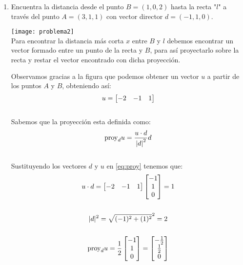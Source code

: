 \documentclass[12pt,titlepage]{article}
\begin{document}
\begin{enumerate}
\clearpage
 \item Encuentra la distancia desde el punto $B= (1, 0, 2)$ hasta la recta  "$l$" a través del punto $A=(3, 1, 1)$ con vector director $d=(-1, 1, 0)$.
 \par \parskip 8mm
 \texttt{[image: problema2]}\\
 Para encontrar la distancia más corta $x$ entre $B$ y $l$ debemos encontrar un vector formado entre un punto de la recta y $B$, para así proyectarlo sobre la recta y restar el vector encontrado con dicha proyección.
 \par \parskip 8mm
 Observamos gracias a la figura que podemos obtener un vector $u$ a partir de los puntos $A$ y $B$, obteniendo así:
 \begin{equation} \setcounter{equation}{1}
    u=\begin{bmatrix}-2&-1&1\\\end{bmatrix} \nonumber
 \end{equation}\\
 Sabemos que la proyección esta definida como:
 \begin{equation}
    {\rm proy}_du=\frac{u\cdot d}{\left|d\right|^2}d \label{eq:proy}
 \end{equation}\\
 Sustituyendo los vectores $d$ y $u$ en \eqref{eq:proy} tenemos que:
 \begin{gather}
    u\cdot d=\begin{bmatrix}-2&-1&1\\\end{bmatrix}
    \begin{bmatrix}-1\\1\\0\\\end{bmatrix}=1\nonumber\\\nonumber\\
    |d|^2={\sqrt{(-1)^2+(1)^2}}^2=2\nonumber\\\nonumber\\
    {\rm proy}_du=\frac{1}{2} \begin{bmatrix}-1\\1\\0\\\end{bmatrix}=\begin{bmatrix}-\frac{1}{2}\\\frac{1}{2}\\0\\\end{bmatrix}\label{eq:proyr}

\end{gather}
\end{enumerate}
\end{document}
